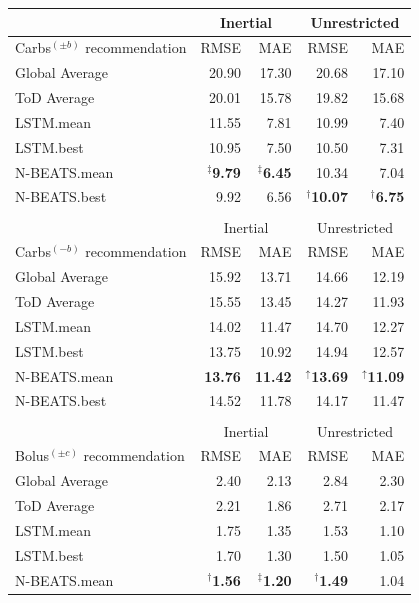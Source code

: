 \documentclass[journal,article,submit,moreauthors,pdftex]{Definitions/mdpi}
\begin{document}
\begin{table}[t]
\begin{center}
\begin{tabular}{|l|rr|rr|}
   	\cline{2-5}
	\multicolumn{1}{c}{} & \multicolumn{2}{|c|}{Inertial} & \multicolumn{2}{c|}{Unrestricted}\\
	\hline
	Carbs$^{(\pm b)}$ recommendation & RMSE & MAE & RMSE & MAE\\
	\hline
	Global Average & 20.90 & 17.30 & 20.68 & 17.10\\
	ToD Average & 20.01 & 15.78 & 19.82 & 15.68\\
	\hline
	LSTM.mean & 11.55 & 7.81 & 10.99 & 7.40\\
	LSTM.best & 10.95 & 7.50 & 10.50 & 7.31\\
	\hline
	N-BEATS.mean & $^\ddagger${\bf 9.79} & $^\ddagger${\bf 6.45} & 10.34 & 7.04\\
	N-BEATS.best & 9.92 & 6.56 & $^\dagger${\bf 10.07} & $^\dagger${\bf 6.75}\\
	\hline
	\multicolumn{5}{c}{}\\[-1.5ex]
	\cline{2-5}
	\multicolumn{1}{c}{} & \multicolumn{2}{|c|}{Inertial} & \multicolumn{2}{c|}{Unrestricted}\\
	\hline
	Carbs$^{(-b)}$ recommendation & RMSE & MAE & RMSE & MAE\\
	\hline
	Global Average & 15.92 & 13.71 & 14.66 & 12.19\\
	ToD Average & 15.55 & 13.45 & 14.27 & 11.93\\
	\hline
	LSTM.mean & 14.02 & 11.47 & 14.70 & 12.27\\
	LSTM.best & 13.75 & 10.92 & 14.94 & 12.57\\
	\hline
	N-BEATS.mean & {\bf 13.76} & {\bf 11.42} & $^\uparrow${\bf 13.69} & $^\uparrow${\bf 11.09}\\
	N-BEATS.best & 14.52 & 11.78 & 14.17 & 11.47\\
	\hline
	\multicolumn{5}{c}{}\\[-1.5ex]
   	\cline{2-5}
	\multicolumn{1}{c}{} & \multicolumn{2}{|c|}{Inertial} & \multicolumn{2}{c|}{Unrestricted}\\
	\hline
	Bolus$^{(\pm c)}$ recommendation & RMSE & MAE & RMSE & MAE\\
	\hline
	Global Average & 2.40 & 2.13 & 2.84 & 2.30\\
	ToD Average & 2.21 & 1.86 & 2.71 & 2.17\\
	\hline
	LSTM.mean & 1.75 & 1.35 & 1.53 & 1.10\\
	LSTM.best & 1.70 & 1.30 & 1.50 & 1.05\\
	\hline
	N-BEATS.mean & $^\dagger${\bf 1.56} & $^\ddagger${\bf 1.20} & $^\dagger${\bf 1.49} & 1.04\\

\end{tabular}
\end{center}
\end{table}
\end{document}
